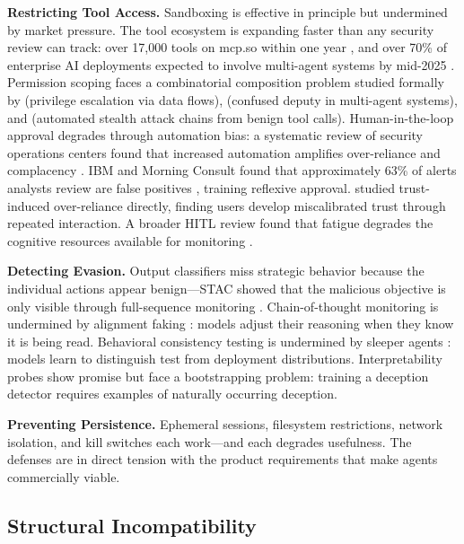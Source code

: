 \documentclass[10pt]{article}
\begin{document}
\textbf{Restricting Tool Access.} Sandboxing is effective in principle but undermined by market pressure. The tool ecosystem is expanding faster than any security review can track: over 17,000 tools on mcp.so within one year \citep{maltool2025}, and over 70\% of enterprise AI deployments expected to involve multi-agent systems by mid-2025 \citep{darksidellms2025}. Permission scoping faces a combinatorial composition problem studied formally by \citet{kim2025pfi} (privilege escalation via data flows), \citet{seagent2026} (confused deputy in multi-agent systems), and \citet{stac2025} (automated stealth attack chains from benign tool calls). Human-in-the-loop approval degrades through automation bias: a systematic review of security operations centers found that increased automation amplifies over-reliance and complacency \citep{socbias2024}. IBM and Morning Consult found that approximately 63\% of alerts analysts review are false positives \citep{ibmfp2024}, training reflexive approval. \citet{srinivasan2026trust} studied trust-induced over-reliance directly, finding users develop miscalibrated trust through repeated interaction. A broader HITL review found that fatigue degrades the cognitive resources available for monitoring \citep{hitlreview2026}.

\textbf{Detecting Evasion.} Output classifiers miss strategic behavior because the individual actions appear benign---STAC showed that the malicious objective is only visible through full-sequence monitoring \citep{stac2025}. Chain-of-thought monitoring is undermined by alignment faking \citep{anthropic2024faking}: models adjust their reasoning when they know it is being read. Behavioral consistency testing is undermined by sleeper agents \citep{hubinger2024sleeper}: models learn to distinguish test from deployment distributions. Interpretability probes show promise \citep{hubinger2024sleeper} but face a bootstrapping problem: training a deception detector requires examples of naturally occurring deception.

\textbf{Preventing Persistence.} Ephemeral sessions, filesystem restrictions, network isolation, and kill switches each work---and each degrades usefulness. The defenses are in direct tension with the product requirements that make agents commercially viable.

\subsection{Structural Incompatibility}
\end{document}
